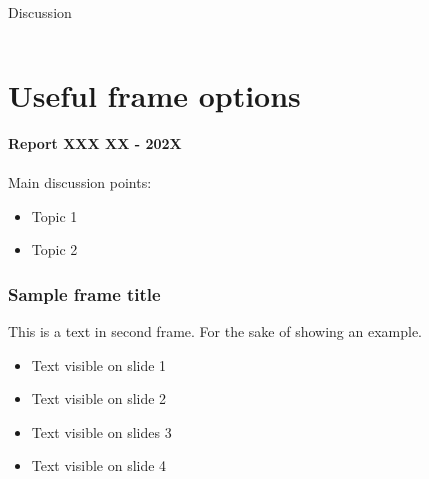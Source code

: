 \documentclass[8pt]{beamer}
\begin{document}
	\begin{frame}{Discussion}
	\begin{columns}
		
		
		
		
	\end{columns}
	\end{frame}



	\section*{Useful frame options}
	\label{}
	\justifying
	\begin{frame}
		\textbf{Report XXX XX - 202X}\\~\\
		Main discussion points:
		\begin{itemize}
			\item Topic 1
			\item Topic 2
		\end{itemize}
	\end{frame}

	\begin{frame}
	\end{frame}
	\begin{frame}
	\end{frame}
	\begin{frame}
	\end{frame}
	\begin{frame}
		\frametitle{Sample frame title}
		This is a text in second frame. For the sake of showing an example.
		
		\begin{itemize}
			\item<1-> Text visible on slide 1
			\item<2-> Text visible on slide 2
			\item<3> Text visible on slides 3
			\item<4-> Text visible on slide 4
		\end{itemize}
	\end{frame}
	
\end{document}
